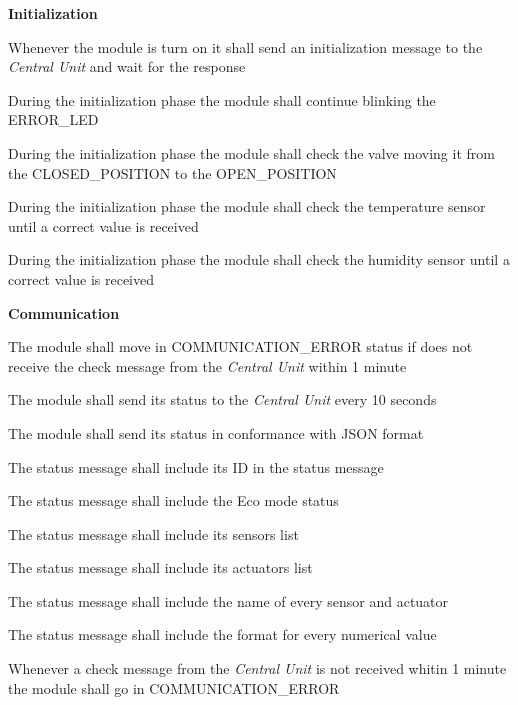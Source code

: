 \begin{req_enum}
	\item \textbf{Initialization}
	\begin{req_enum}[label*=\arabic*.]
		\item Whenever the module is turn on it shall send an initialization message to the \textit{Central Unit} and wait for the response
		\item During the initialization phase the module shall continue blinking the ERROR\_LED
		\item During the initialization phase the module shall check the valve moving it from the CLOSED\_POSITION to the OPEN\_POSITION
		\item During the initialization phase the module shall check the temperature sensor until a correct value is received
		\item During the initialization phase the module shall check the humidity sensor until a correct value is received
	\end{req_enum}

	\item \textbf{Communication}
	\begin{req_enum}[label*=\arabic*.]
		\item The module shall move in COMMUNICATION\_ERROR status if does not receive the check message from the \textit{Central Unit} within 1 minute
		\item The module shall send its status to the \textit{Central Unit} every 10 seconds
		\item The module shall send its status in conformance with JSON format
		\begin{req_enum}[label*=\arabic*.]
			\item The status message shall include its ID in the status message
			\item The status message shall include the Eco mode status
			\item The status message shall include its sensors list
			\item The status message shall include its actuators list
			\item The status message shall include the name of every sensor and actuator
			\item The status message shall include the format for every numerical value
		\end{req_enum}
		\item Whenever a check message from the \textit{Central Unit} is not received whitin 1 minute the module shall go in COMMUNICATION\_ERROR
	\end{req_enum}


\end{req_enum}

